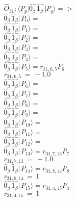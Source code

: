 \documentclass[14pt]{article}
\begin{document}
    $\hat{O}_{31}:  \langle{P_p}\vert \hat{0}_{\beta}^{-}\hat{1}_{\beta}^{-} \vert{P_q}\rangle => $ \\ 
    $ \hat{0}_{\beta}^{-}\hat{1}_{\beta}^{-} \vert{P_{0}}\rangle =  $ \\ 
    $ \hat{0}_{\beta}^{-}\hat{1}_{\beta}^{-} \vert{P_{1}}\rangle =  $ \\ 
    $ \hat{0}_{\beta}^{-}\hat{1}_{\beta}^{-} \vert{P_{2}}\rangle =  $ \\ 
    $ \hat{0}_{\beta}^{-}\hat{1}_{\beta}^{-} \vert{P_{3}}\rangle =  $ \\ 
    $ \hat{0}_{\beta}^{-}\hat{1}_{\beta}^{-} \vert{P_{4}}\rangle =  $ \\ 
    $ \hat{0}_{\beta}^{-}\hat{1}_{\beta}^{-} \vert{P_{5}}\rangle = {r}_{31,6,5}P_{6} $ \\ 
    ${r}_{31,6,5}\ =\ -1.0 $ \\ 
    $ \hat{0}_{\beta}^{-}\hat{1}_{\beta}^{-} \vert{P_{6}}\rangle =  $ \\ 
    $ \hat{0}_{\beta}^{-}\hat{1}_{\beta}^{-} \vert{P_{7}}\rangle =  $ \\ 
    $ \hat{0}_{\beta}^{-}\hat{1}_{\beta}^{-} \vert{P_{8}}\rangle =  $ \\ 
    $ \hat{0}_{\beta}^{-}\hat{1}_{\beta}^{-} \vert{P_{9}}\rangle =  $ \\ 
    $ \hat{0}_{\beta}^{-}\hat{1}_{\beta}^{-} \vert{P_{10}}\rangle =  $ \\ 
    $ \hat{0}_{\beta}^{-}\hat{1}_{\beta}^{-} \vert{P_{11}}\rangle =  $ \\ 
    $ \hat{0}_{\beta}^{-}\hat{1}_{\beta}^{-} \vert{P_{12}}\rangle =  $ \\ 
    $ \hat{0}_{\beta}^{-}\hat{1}_{\beta}^{-} \vert{P_{13}}\rangle = {r}_{31,7,13}P_{7} $ \\ 
    ${r}_{31,7,13}\ =\ -1.0 $ \\ 
    $ \hat{0}_{\beta}^{-}\hat{1}_{\beta}^{-} \vert{P_{14}}\rangle = {r}_{31,8,14}P_{8} $ \\ 
    ${r}_{31,8,14}\ =\ 1 $ \\ 
    $ \hat{0}_{\beta}^{-}\hat{1}_{\beta}^{-} \vert{P_{15}}\rangle = {r}_{31,4,15}P_{4} $ \\ 
    ${r}_{31,4,15}\ =\ 1 $ \\ 
    
\end{document}
